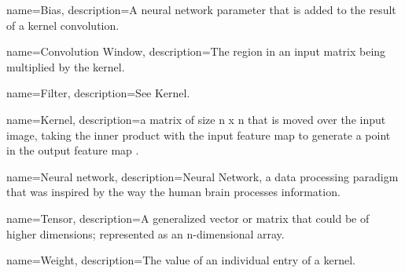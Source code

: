 




{
    name=Bias,
    description={A neural network parameter that is added to the result of a kernel convolution.}
}

{
    name=Convolution Window,
    description={The region in an input matrix being multiplied by the kernel.}
}

{
    name=Filter,
    description={See Kernel.}
}

{
    name=Kernel,
    description={a matrix of size n x n that is moved over the input image, taking the inner product with the input feature map to generate a point in the output feature map .}
}

{
    name=Neural network,
    description={Neural Network, a data processing paradigm that was inspired by the way the human brain processes information.}
}

{
    name=Tensor,
    description={A generalized vector or matrix that could be of higher dimensions; represented as an n-dimensional array.}
}

{
    name=Weight,
    description={The value of an individual entry of a kernel.}
}
